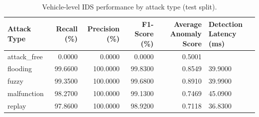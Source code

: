 \begin{table}[t]
\centering
\begin{tabular}{lrrrrl}
\toprule
Attack Type & Recall (\%) & Precision (\%) & F1-Score (\%) & Average Anomaly Score & Detection Latency (ms) \\
\midrule
attack\_free & 0.0000 & 0.0000 & 0.0000 & 0.5001 &  \\
flooding & 99.6600 & 100.0000 & 99.8300 & 0.8549 & 39.9000 \\
fuzzy & 99.3500 & 100.0000 & 99.6800 & 0.8910 & 39.9900 \\
malfunction & 98.2700 & 100.0000 & 99.1300 & 0.7469 & 45.0900 \\
replay & 97.8600 & 100.0000 & 98.9200 & 0.7118 & 36.8300 \\
\bottomrule
\end{tabular}
\caption{Vehicle-level IDS performance by attack type (test split).}
\label{tab:vehicle-ids-by-attack}
\end{table}
